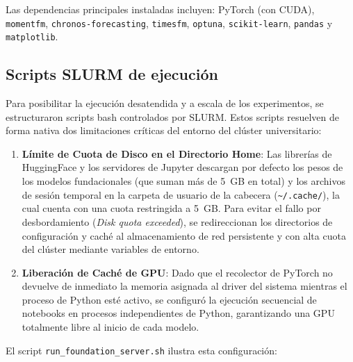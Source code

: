 \documentclass[12pt, a4paper]{article}
\newcommand{\code}[1]{\texttt{#1}}
\begin{document}
Las dependencias principales instaladas incluyen: PyTorch (con CUDA), \code{momentfm}, \code{chronos-forecasting}, \code{timesfm}, \code{optuna}, \code{scikit-learn}, \code{pandas} y \code{matplotlib}.

\subsection{Scripts SLURM de ejecución}

Para posibilitar la ejecución desatendida y a escala de los experimentos, se estructuraron scripts bash controlados por SLURM. Estos scripts resuelven de forma nativa dos limitaciones críticas del entorno del clúster universitario:
\begin{enumerate}
    \item \textbf{Límite de Cuota de Disco en el Directorio Home}: Las librerías de HuggingFace y los servidores de Jupyter descargan por defecto los pesos de los modelos fundacionales (que suman más de 5~GB en total) y los archivos de sesión temporal en la carpeta de usuario de la cabecera (\code{\textasciitilde{}/.cache/}), la cual cuenta con una cuota restringida a 5~GB. Para evitar el fallo por desbordamiento (\emph{Disk quota exceeded}), se redireccionan los directorios de configuración y caché al almacenamiento de red persistente y con alta cuota del clúster mediante variables de entorno.
    \item \textbf{Liberación de Caché de GPU}: Dado que el recolector de PyTorch no devuelve de inmediato la memoria asignada al driver del sistema mientras el proceso de Python esté activo, se configuró la ejecución secuencial de notebooks en procesos independientes de Python, garantizando una GPU totalmente libre al inicio de cada modelo.
\end{enumerate}

El script \code{run\_foundation\_server.sh} ilustra esta configuración:
\end{document}
